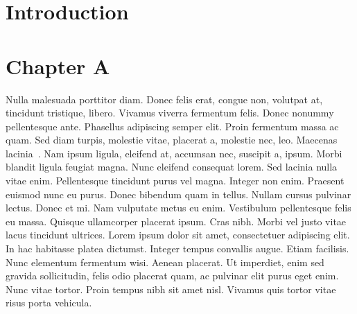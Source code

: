 \documentclass[14pt]{constructor-diploma}
\begin{document}
\maketitle
\tableofcontents
\section*{Introduction}
\lipsum[1-2]

\section{Chapter A}
Nulla malesuada porttitor diam. Donec felis erat, congue non, volutpat at, tincidunt tristique, libero. Vivamus viverra fermentum felis. Donec nonummy pellentesque ante. Phasellus adipiscing semper elit. Proin fermentum massa ac quam. Sed diam turpis, molestie vitae, placerat a, molestie nec, leo.
Maecenas lacinia~\cite{test}. Nam ipsum ligula, eleifend at, accumsan nec, suscipit a, ipsum. Morbi blandit ligula feugiat magna. Nunc eleifend consequat lorem. Sed lacinia nulla vitae enim. Pellentesque tincidunt purus vel magna. Integer non enim. Praesent euismod nunc eu purus. Donec bibendum quam in tellus. Nullam cursus pulvinar lectus. Donec et mi. Nam vulputate metus eu enim. Vestibulum pellentesque felis eu massa. Quisque ullamcorper placerat ipsum. Cras nibh. Morbi vel justo vitae lacus tincidunt ultrices. Lorem ipsum dolor sit amet, consectetuer adipiscing elit. In hac habitasse platea dictumst. Integer tempus convallis augue. Etiam facilisis. Nunc elementum fermentum wisi. Aenean placerat. Ut imperdiet, enim sed gravida sollicitudin, felis odio placerat quam, ac pulvinar elit purus eget enim. Nunc vitae tortor. Proin tempus nibh sit amet nisl. Vivamus quis tortor vitae risus porta vehicula.
\end{document}

